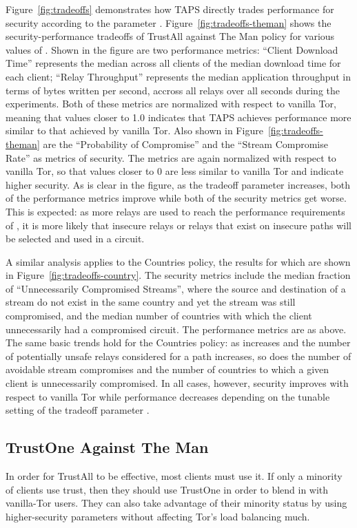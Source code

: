 \documentclass[conference]{styles/IEEEtran}
\newcommand{\ps}{TAPS\xspace}
\begin{document}
Figure~\ref{fig:tradeoffs} demonstrates how \ps directly trades performance for
security according to the parameter .
Figure~\ref{fig:tradeoffs-theman} shows the security-performance tradeoffs of
TrustAll against \textsf{The Man} policy for various values of . Shown in the
figure are two performance metrics: ``Client Download Time'' represents the
median across all clients of the median download time for each client; ``Relay
Throughput'' represents the median application throughput in terms of bytes
written per second, accross all relays over all seconds during the experiments.
Both of these metrics are normalized with respect to vanilla Tor, meaning that
values closer to 1.0 indicates that \ps achieves performance more similar to
that achieved by vanilla Tor. Also shown in Figure~\ref{fig:tradeoffs-theman}
are the ``Probability of Compromise'' and the ``Stream Compromise Rate'' as
metrics of security. The metrics are again normalized with respect to vanilla
Tor, so that values closer to 0 are less similar to vanilla Tor and indicate
higher security. As is clear in the figure, as the tradeoff parameter
 increases, both of the performance metrics improve while both of
the security metrics get worse. This is expected: as more relays are used to
reach the performance requirements of , it is more likely that
insecure relays or relays that exist on insecure paths will be selected and used
in a circuit.

A similar analysis applies to the \textsf{Countries} policy, the results for which are
shown in Figure~\ref{fig:tradeoffs-country}. The security metrics include the
median fraction of ``Unnecessarily Compromised Streams'', where the source and
destination of a stream do not exist in the same country and yet the stream was
still compromised, and the median number of countries with which the client
unnecessarily had a compromised circuit. The performance metrics are as above.
The same basic trends hold for the \textsf{Countries} policy: as 
increases and the number of potentially unsafe relays considered for a path
increases, so does the number of avoidable stream compromises and the number of
countries to which a given client is unnecessarily compromised. In all
cases, however, security improves with respect to vanilla Tor while performance
decreases depending on the tunable setting of the tradeoff parameter
.

\subsection{TrustOne Against \textsf{The Man}}
In order for TrustAll to be effective, most clients must use it. If only a minority of clients
use trust, then they should use TrustOne in order to blend in with vanilla-Tor users. They can
also take advantage of their minority status by using higher-security parameters without
affecting Tor's load balancing much.
\end{document}
